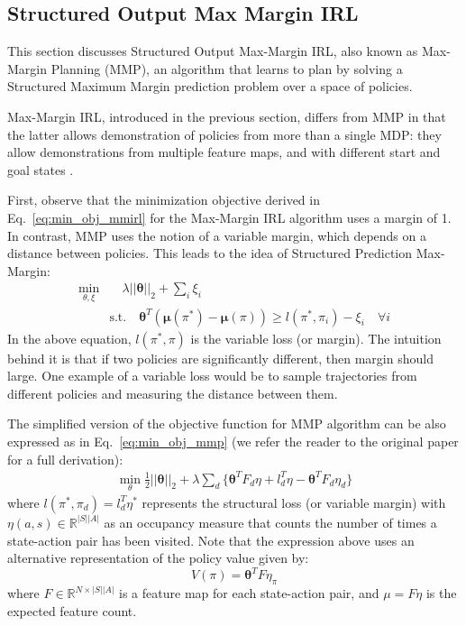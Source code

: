 \documentclass[11pt]{article}
\begin{document}
\subsection{Structured Output Max Margin IRL}

This section discusses Structured Output Max-Margin IRL, also known as Max-Margin Planning (MMP), an algorithm that learns to plan by solving a Structured Maximum Margin prediction problem over a space of policies. 

Max-Margin IRL, introduced in the previous section, differs from MMP in that the latter allows demonstration of policies from more than a single MDP: they allow demonstrations from multiple feature maps, and with different start and goal states \cite{MMP}.

First, observe that the minimization objective derived in Eq.~\ref{eq:min_obj_mmirl} for the Max-Margin IRL algorithm uses a margin of 1. In contrast, MMP uses the notion of a variable margin, which depends on a distance between policies. This leads to the idea of Structured Prediction Max-Margin:
\begin{equation}
    \label{eq:min_obj_mmp}
    \begin{split}
        \min\limits_{\theta, \xi} & \quad\lambda ||\boldsymbol\theta||_2 + \sum\limits_i \xi_i \\
        & \textrm{s.t.} \quad \boldsymbol{\theta}^T(\boldsymbol{\mu}(\pi^\ast) - \boldsymbol{\mu}(\pi)) \geq l(\pi^\ast, \pi_i) - \xi_i \quad \forall i
    \end{split}
\end{equation}
In the above equation, $l(\pi^\ast, \pi)$ is the variable loss (or margin). The intuition behind it is that if two policies are significantly different, then margin should large. One example of a variable loss would be to sample trajectories from different policies and measuring the distance between them. 

The simplified version of the objective function for MMP algorithm can be also expressed as in Eq.~\ref{eq:min_obj_mmp} (we refer the reader to the original paper for a full derivation):
\begin{equation}
    \label{eq:min_obj_mmp}
    \begin{split}
        \min\limits_{\theta} \frac{1}{2}||\boldsymbol{\theta}||_2 
        + \lambda \sum\limits_d\big\{ \boldsymbol{\theta}^TF_d\eta + l_d^T\eta  - 
        \boldsymbol{\theta}^T F_d \eta_d \big\}
    \end{split}
\end{equation}
where $l(\pi^\ast, \pi_d) = l_d^T \eta^\ast$ represents the structural loss (or variable margin) with $\eta(a, s) \in \mathbb{R}^{|S||A|}$ as an occupancy measure that counts the number of times a state-action pair has been visited. Note that the expression above uses an alternative representation of the policy value given by:
\begin{equation}
    V(\pi) = \boldsymbol{\theta}^{T} F \eta_\pi
\end{equation}
where $F \in \mathbb{R}^{N \times |S||A|}$ is a feature map for each state-action pair, and $\mu = F\eta$ is the expected feature count. 
\end{document}
